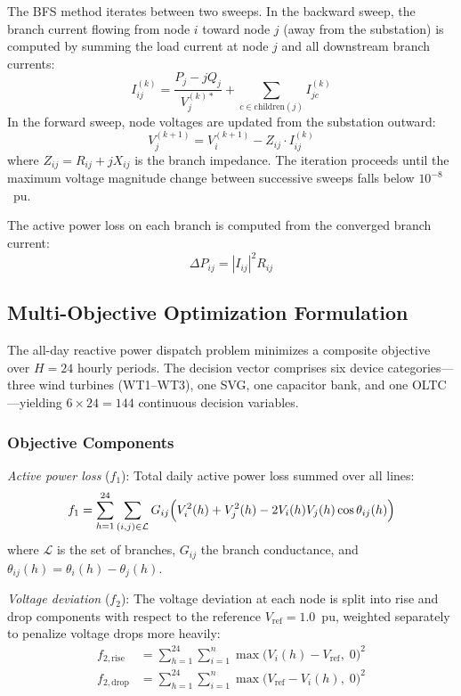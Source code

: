 The BFS method iterates between two sweeps. In the backward sweep, the branch current flowing from node $i$ toward node $j$ (away from the substation) is computed by summing the load current at node $j$ and all downstream branch currents:
\begin{equation}
I_{ij}^{(k)} = \frac{P_j - jQ_j}{V_j^{(k)*}} + \sum_{c \in \text{children}(j)} I_{jc}^{(k)}
\label{eq:bfs_backward}
\end{equation}
In the forward sweep, node voltages are updated from the substation outward:
\begin{equation}
V_j^{(k+1)} = V_i^{(k+1)} - Z_{ij} \cdot I_{ij}^{(k)}
\label{eq:bfs_forward}
\end{equation}
where $Z_{ij} = R_{ij} + jX_{ij}$ is the branch impedance. The iteration proceeds until the maximum voltage magnitude change between successive sweeps falls below $10^{-8}$~pu.

The active power loss on each branch is computed from the converged branch current:
\begin{equation}
\Delta P_{ij} = \left|I_{ij}\right|^2 R_{ij}
\label{eq:line_loss}
\end{equation}

\subsection{Multi-Objective Optimization Formulation}

The all-day reactive power dispatch problem minimizes a composite objective over $H=24$ hourly periods. The decision vector comprises six device categories---three wind turbines (WT1--WT3), one SVG, one capacitor bank, and one OLTC---yielding $6 \times 24 = 144$ continuous decision variables.

\subsubsection{Objective Components}

\textit{Active power loss} ($f_1$): Total daily active power loss summed over all lines:
\begin{equation}
f_1 = \sum_{h=1}^{24} \sum_{(i,j) \in \mathcal{L}} G_{ij}\Bigl(V_i^2(h) + V_j^2(h) - 2V_i(h)V_j(h)\cos\theta_{ij}(h)\Bigr)
\label{eq:f1_active_loss}
\end{equation}
where $\mathcal{L}$ is the set of branches, $G_{ij}$ the branch conductance, and $\theta_{ij}(h)=\theta_i(h)-\theta_j(h)$.

\textit{Voltage deviation} ($f_2$): The voltage deviation at each node is split into rise and drop components with respect to the reference $V_{\text{ref}}=1.0$~pu, weighted separately to penalize voltage drops more heavily:
\begin{equation}
\begin{aligned}
f_{2,\text{rise}} &= \sum_{h=1}^{24} \sum_{i=1}^{n} \max\!\bigl(V_i(h) - V_{\text{ref}},\; 0\bigr)^2 \\
f_{2,\text{drop}} &= \sum_{h=1}^{24} \sum_{i=1}^{n} \max\!\bigl(V_{\text{ref}} - V_i(h),\; 0\bigr)^2
\end{aligned}
\label{eq:f2_voltage}
\end{equation}

